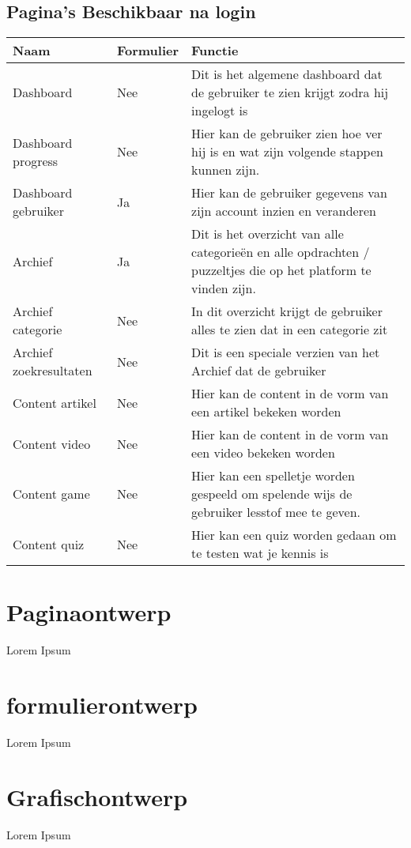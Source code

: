 \documentclass[]{report}
\begin{document}
\section{Pagina's Beschikbaar na login}
\begin{tabular}{ l l p{6cm} }
	\textbf{Naam} & \textbf{Formulier} & \textbf{Functie} \\ \hline
	Dashboard 			& Nee		& Dit is het algemene dashboard dat de gebruiker te zien krijgt zodra hij ingelogt is \\ 
	Dashboard progress 	& Nee		& Hier kan de gebruiker zien hoe ver hij is en wat zijn volgende stappen kunnen zijn. \\
	Dashboard gebruiker	& Ja		& Hier kan de gebruiker gegevens van zijn account inzien en veranderen \\
	Archief 			& Ja		& Dit is het overzicht van alle categorieën en alle opdrachten / puzzeltjes die op het platform te vinden zijn. \\ 
	Archief categorie		& Nee	& In dit overzicht krijgt de gebruiker alles te zien dat in een categorie zit \\
	Archief zoekresultaten	& Nee 	& Dit is een speciale verzien van het Archief dat de gebruiker  \\
	Content artikel 	& Nee		& Hier kan de content in de vorm van een artikel bekeken worden  \\
	Content video 		& Nee 		& Hier kan de content in de vorm van een video bekeken worden \\
	Content game 		& Nee 		& Hier kan een spelletje worden gespeeld om spelende wijs de gebruiker lesstof mee te geven. \\
	Content quiz 		& Nee 		& Hier kan een quiz worden gedaan om te testen wat je kennis is \\
\end{tabular}




\chapter{Paginaontwerp}

Lorem Ipsum




\chapter{formulierontwerp}

Lorem Ipsum




\chapter{Grafischontwerp}

Lorem Ipsum
\end{document}
